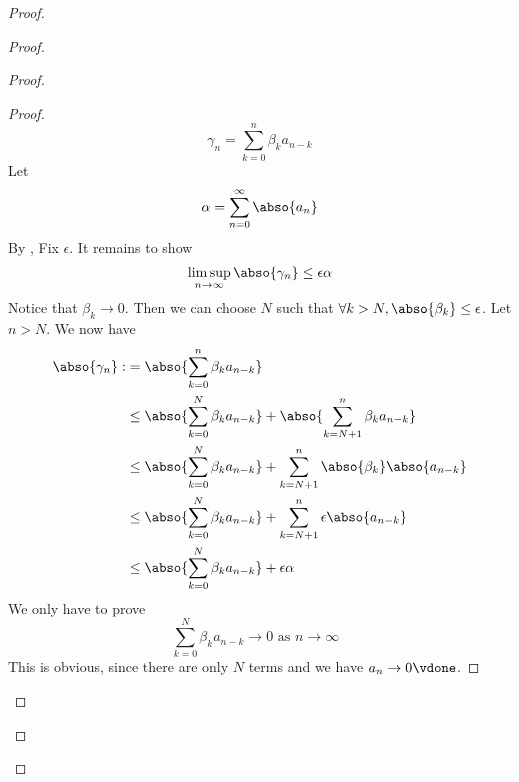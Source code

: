\documentclass{report}
\begin{document}
\begin{proof}
\begin{proof}
\begin{proof}
\begin{proof}
\begin{equation*}
\gamma_n=\sum_{k=0}^n \beta_k a_{n-k}
\end{equation*}
Let 
\begin{equation*}
\alpha =\sum_{n=0}^\infty \abso{a_n}
\end{equation*}
By , 
Fix $\epsilon $. It remains to show
\begin{equation*}
\limsup_{n\to\infty} \abso{\gamma_n}\leq \epsilon \alpha 
\end{equation*}
Notice that $\beta_k \to 0$. Then we can choose $N$ such that  $\forall k>N, \abso{\beta _k}\leq \epsilon $. Let $n>N$. We now have 
 \begin{align*}
\abso{\gamma_n}:&=\abso{\sum_{k=0}^n  \beta_k a_{n-k}}\\
&\leq \abso{\sum_{k=0}^N \beta_k a_{n-k}}+\abso{\sum_{k=N+1}^n \beta_k a_{n-k}}\\
&\leq \abso{\sum_{k=0}^N \beta _k a_{n-k}}+ \sum_{k=N+1}^n \abso{\beta_k} \abso{a_{n-k}}\\
&\leq \abso{\sum_{k=0}^N \beta_k a_{n-k}}+\sum_{k=N+1}^n \epsilon \abso{a_{n-k}}\\
&\leq \abso{\sum_{k=0}^N \beta_k a_{n-k}}+\epsilon \alpha 
\end{align*}
We only have to prove 
\begin{equation*}
\sum_{k=0}^N \beta_k a_{n-k} \to 0\text{ as $n\to \infty$ }
\end{equation*}
This is obvious, since there are only $N$ terms and we have  $a_n \to 0\vdone$. 
\end{proof}

\end{proof}
\end{proof}
\end{proof}
\end{document}

